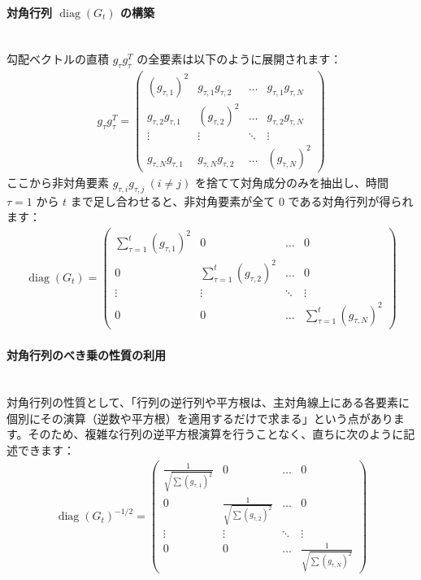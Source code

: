 \documentclass[dvipdfmx,a4paper,11pt]{jsarticle}
\begin{document}
\paragraph{対角行列 $\operatorname{diag}(G_t)$ の構築}\ \\
勾配ベクトルの直積 $g_\tau g_\tau^T$ の全要素は以下のように展開されます：
\begin{align*}
    g_\tau g_\tau^T = 
    \begin{pmatrix} 
    (g_{\tau,1})^2 & g_{\tau,1}g_{\tau,2} & \dots & g_{\tau,1}g_{\tau,N} \\ 
    g_{\tau,2}g_{\tau,1} & (g_{\tau,2})^2 & \dots & g_{\tau,2}g_{\tau,N} \\ 
    \vdots & \vdots & \ddots & \vdots \\ 
    g_{\tau,N}g_{\tau,1} & g_{\tau,N}g_{\tau,2} & \dots & (g_{\tau,N})^2 
    \end{pmatrix}
\end{align*}
ここから非対角要素 $g_{\tau,i}g_{\tau,j} \ (i \neq j)$ を捨てて対角成分のみを抽出し、時間 $\tau=1$ から $t$ まで足し合わせると、非対角要素が全て $0$ である対角行列が得られます：
\begin{align*}
    \operatorname{diag}(G_t) = 
    \begin{pmatrix} 
    \sum_{\tau=1}^t (g_{\tau,1})^2 & 0 & \dots & 0 \\ 
    0 & \sum_{\tau=1}^t (g_{\tau,2})^2 & \dots & 0 \\ 
    \vdots & \vdots & \ddots & \vdots \\ 
    0 & 0 & \dots & \sum_{\tau=1}^t (g_{\tau,N})^2 
    \end{pmatrix}
\end{align*}

\paragraph{対角行列のべき乗の性質の利用}\ \\
対角行列の性質として、「行列の逆行列や平方根は、主対角線上にある各要素に個別にその演算（逆数や平方根）を適用するだけで求まる」という点があります。そのため、複雑な行列の逆平方根演算を行うことなく、直ちに次のように記述できます：
\begin{align*}
    \operatorname{diag}(G_t)^{-1/2} = 
    \begin{pmatrix} 
    \frac{1}{\sqrt{\sum (g_{\tau,1})^2}} & 0 & \dots & 0 \\ 
    0 & \frac{1}{\sqrt{\sum (g_{\tau,2})^2}} & \dots & 0 \\ 
    \vdots & \vdots & \ddots & \vdots \\ 
    0 & 0 & \dots & \frac{1}{\sqrt{\sum (g_{\tau,N})^2}} 
    \end{pmatrix}
\end{align*}
\end{document}
